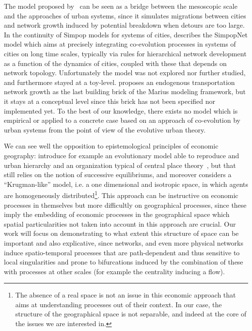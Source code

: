 The model proposed by~\cite{blumenfeld2010network} can be seen as a bridge between the mesoscopic scale and the approaches of urban systems, since it simulates migrations between cities and network growth induced by potential breakdown when detours are too large. In the continuity of Simpop models for systems of cities, \cite{schmitt2014modelisation} describes the SimpopNet model which aims at precisely integrating co-evolution processes in systems of cities on long time scales, typically via rules for hierarchical network development as a function of the dynamics of cities, coupled with these that depends on network topology. Unfortunately the model was not explored nor further studied, and furthermore stayed at a toy-level. \cite{cottineau2014evolution} proposes an endogenous transportation network growth as the last building brick of the Marius modeling framework, but it stays at a conceptual level since this brick has not been specified nor implemented yet. To the best of our knowledge, there exists no model which is empirical or applied to a concrete case based on an approach of co-evolution by urban systems from the point of view of the evolutive urban theory.



We can see well the opposition to epistemological principles of economic geography: \cite{fujita1999evolution} introduce for example an evolutionary model able to reproduce and urban hierarchy and an organization typical of central place theory~\cite{banos2011christaller}, but that still relies on the notion of successive equilibriums, and moreover considers a ``Krugman-like'' model, i.e. a one dimensional and isotropic space, in which agents are homogeneously distributed\footnote{The absence of a real space is not an issue in this economic approach that aims at understanding processes out of their context. In our case, the structure of the geographical space is not separable, and indeed at the core of the issues we are interested in.}. This approach can be instructive on economic processes in themselves but more difficultly on geographical processes, since these imply the embedding of economic processes in the geographical space which spatial particularities not taken into account in this approach are crucial. Our work will focus on demonstrating to what extent this structure of space can be important and also explicative, since networks, and even more physical networks induce spatio-temporal processes that are path-dependent and thus sensitive to local singularities and prone to bifurcations induced by the combination of these with processes at other scales (for example the centrality inducing a flow).


